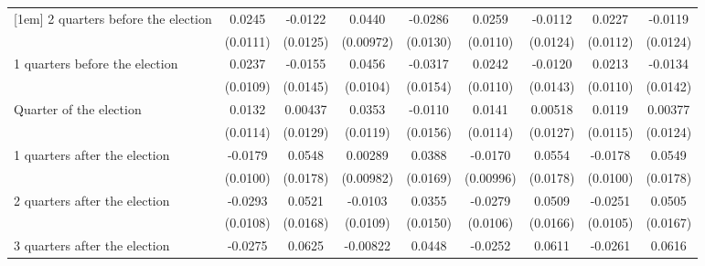 \begin{table}[htbp]
\begin{tabular}{l*{8}{c}}
[1em]
 2 quarters before the election&      0.0245\sym{*}  &     -0.0122         &      0.0440\sym{***}&     -0.0286\sym{*}  &      0.0259\sym{*}  &     -0.0112         &      0.0227\sym{*}  &     -0.0119         \\
                    &    (0.0111)         &    (0.0125)         &   (0.00972)         &    (0.0130)         &    (0.0110)         &    (0.0124)         &    (0.0112)         &    (0.0124)         \\
[1em]
 1 quarters before the election&      0.0237\sym{*}  &     -0.0155         &      0.0456\sym{***}&     -0.0317\sym{*}  &      0.0242\sym{*}  &     -0.0120         &      0.0213         &     -0.0134         \\
                    &    (0.0109)         &    (0.0145)         &    (0.0104)         &    (0.0154)         &    (0.0110)         &    (0.0143)         &    (0.0110)         &    (0.0142)         \\
[1em]
Quarter of the election&      0.0132         &     0.00437         &      0.0353\sym{**} &     -0.0110         &      0.0141         &     0.00518         &      0.0119         &     0.00377         \\
                    &    (0.0114)         &    (0.0129)         &    (0.0119)         &    (0.0156)         &    (0.0114)         &    (0.0127)         &    (0.0115)         &    (0.0124)         \\
[1em]
 1 quarters after the election&     -0.0179         &      0.0548\sym{**} &     0.00289         &      0.0388\sym{*}  &     -0.0170         &      0.0554\sym{**} &     -0.0178         &      0.0549\sym{**} \\
                    &    (0.0100)         &    (0.0178)         &   (0.00982)         &    (0.0169)         &   (0.00996)         &    (0.0178)         &    (0.0100)         &    (0.0178)         \\
[1em]
 2 quarters after the election&     -0.0293\sym{**} &      0.0521\sym{**} &     -0.0103         &      0.0355\sym{*}  &     -0.0279\sym{**} &      0.0509\sym{**} &     -0.0251\sym{*}  &      0.0505\sym{**} \\
                    &    (0.0108)         &    (0.0168)         &    (0.0109)         &    (0.0150)         &    (0.0106)         &    (0.0166)         &    (0.0105)         &    (0.0167)         \\
[1em]
 3 quarters after the election&     -0.0275\sym{**} &      0.0625\sym{***}&    -0.00822         &      0.0448\sym{***}&     -0.0252\sym{**} &      0.0611\sym{***}&     -0.0261\sym{**} &      0.0616\sym{***}\\

\end{tabular}
\end{table}
